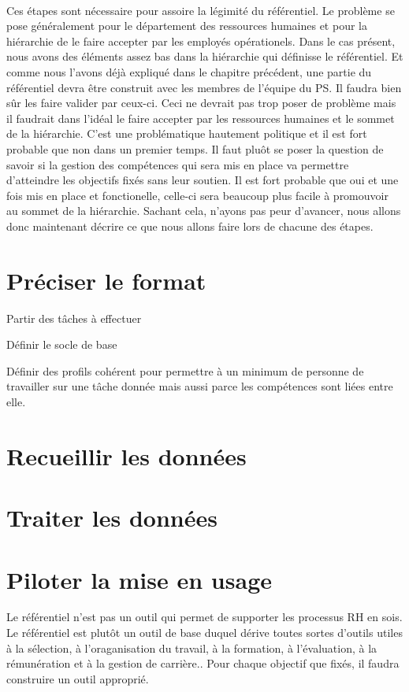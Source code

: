 \paragraph{} Ces étapes sont nécessaire pour assoire la légimité du référentiel. Le problème se pose généralement pour le département des ressources humaines et pour la hiérarchie de le faire accepter par les employés opérationels. Dans le cas présent, nous avons des éléments assez bas dans la hiérarchie qui définisse le référentiel. Et comme nous l'avons déjà expliqué dans le chapitre précédent, une partie du référentiel devra être construit avec les membres de l'équipe du PS. Il faudra bien sûr les faire valider par ceux-ci. Ceci ne devrait pas trop poser de problème mais il faudrait dans l'idéal le faire accepter par les ressources humaines et le sommet de la hiérarchie. C'est une problématique hautement politique et il est fort probable que non dans un premier temps. Il faut pluôt se poser la question de savoir si la gestion des compétences qui sera mis en place va permettre d'atteindre les objectifs fixés sans leur soutien. Il est fort probable que oui et une fois mis en place et fonctionelle, celle-ci sera beaucoup plus facile à promouvoir au sommet de la hiérarchie. Sachant cela, n'ayons pas peur d'avancer, nous allons donc maintenant décrire ce que nous allons faire lors de chacune des étapes. 

\section{Préciser le format}
Partir des tâches à effectuer

Définir le socle de base

Définir des profils cohérent pour permettre à un minimum de personne de travailler sur une tâche donnée mais aussi parce les compétences sont liées entre elle. 
\section{Recueillir les données}

\section{Traiter les données}


\section{Piloter la mise en usage}
Le référentiel n'est pas un outil qui permet de supporter les processus RH en sois. Le référentiel est plutôt un outil de base duquel dérive toutes sortes d'outils utiles à la sélection, à l'oraganisation du travail, à la formation, à l'évaluation, à la rémunération et à la gestion de carrière.\citep[pp.29]{refcompetence}. Pour chaque objectif que fixés, il faudra construire un outil approprié. 

